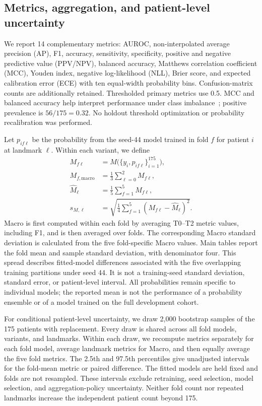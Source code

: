 \subsection{Metrics, aggregation, and patient-level uncertainty}
We report 14 complementary metrics: AUROC, non-interpolated average precision (AP), F1, accuracy, sensitivity, specificity, positive and negative predictive value (PPV/NPV), balanced accuracy, Matthews correlation coefficient (MCC), Youden index, negative log-likelihood (NLL), Brier score, and expected calibration error (ECE) with ten equal-width probability bins. Confusion-matrix counts are additionally retained. Thresholded primary metrics use 0.5. MCC and balanced accuracy help interpret performance under class imbalance~\citep{chicco2020mcc}; positive prevalence is $56/175=0.32$. No holdout threshold optimization or probability recalibration was performed.

Let $p_{if\ell}$ be the probability from the seed-44 model trained in fold $f$ for patient $i$ at landmark $\ell$. Within each variant, we define
\begin{equation}
\begin{aligned}
 M_{f\ell}&=M\bigl(\{y_i,p_{if\ell}\}_{i=1}^{175}\bigr),\\
 M_{f,\mathrm{macro}}&=\frac{1}{3}\sum_{\ell=0}^{2}M_{f\ell},\\
 \widehat M_\ell&=\frac{1}{5}\sum_{f=1}^{5}M_{f\ell},\\
 s_{M,\ell}&=\sqrt{\frac{1}{4}\sum_{f=1}^{5}
 (M_{f\ell}-\widehat M_\ell)^2}.
\end{aligned}
\end{equation}
Macro is first computed within each fold by averaging T0--T2 metric values, including F1, and is then averaged over folds. The corresponding Macro standard deviation is calculated from the five fold-specific Macro values. Main tables report the fold mean and sample standard deviation, with denominator four. This spread describes fitted-model differences associated with the five overlapping training partitions under seed 44. It is not a training-seed standard deviation, standard error, or patient-level interval. All probabilities remain specific to individual models; the reported mean is not the performance of a probability ensemble or of a model trained on the full development cohort.

For conditional patient-level uncertainty, we draw 2,000 bootstrap samples of the 175 patients with replacement. Every draw is shared across all fold models, variants, and landmarks. Within each draw, we recompute metrics separately for each fold model, average landmark metrics for Macro, and then equally average the five fold metrics. The 2.5th and 97.5th percentiles give unadjusted intervals for the fold-mean metric or paired difference. The fitted models are held fixed and folds are not resampled. These intervals exclude retraining, seed selection, model selection, and aggregation-policy uncertainty. Neither fold count nor repeated landmarks increase the independent patient count beyond 175.

